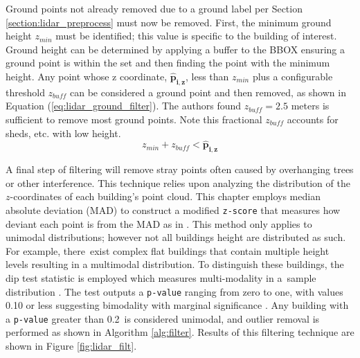 Ground points not already removed due to a ground label per Section \ref{section:lidar_preprocess} must now be removed. First, the minimum ground height $z_{min}$ must be identified; this value is specific to the building of interest.  Ground height can be determined by applying a buffer to the BBOX ensuring a ground point is within the set and then finding the point with the minimum height. Any point whose z coordinate, $\boldsymbol{\hat{p}_{i,z}}$, less than $z_{min}$ plus a configurable threshold $z_{buff}$ can be considered a ground point and then removed, as shown in Equation (\ref{eq:lidar_ground_filter}).  The authors found $z_{buff}=2.5$ meters is sufficient to remove most ground points. Note this fractional $z_{buff}$ accounts for sheds, etc. with low height.
\begin{equation}\label{eq:lidar_ground_filter}
z_{min} + z_{buff}  < \boldsymbol{\hat{p}_{i,z}}
\end{equation}

A final step of filtering will remove stray points often caused by overhanging trees or other interference. This technique relies upon analyzing the distribution of the $z$-coordinates of each building's point cloud. This chapter employs median absolute deviation (MAD) to construct a modified \texttt{z-score} that measures how deviant each point is from the MAD  as in \cite{iglewicz_how_1993}. This method only applies to unimodal distributions; however not all buildings height are distributed as such. For example, there~exist complex flat buildings that contain multiple height levels resulting in a multimodal distribution. To distinguish these buildings, the dip test statistic is employed which measures multi-modality in a~sample distribution \cite{hartigan_algorithm_1985}. The test outputs a \texttt{p-value} ranging from zero to one, with values 0.10 or less suggesting bimodality with marginal significance \cite{freeman_assessing_2013}. Any building with a \texttt{p-value} greater than 0.2~is considered unimodal, and outlier removal is performed as shown in Algorithm \ref{alg:filter}. Results of this filtering technique are shown in Figure \ref{fig:lidar_filt}.%

\vspace{12pt}

